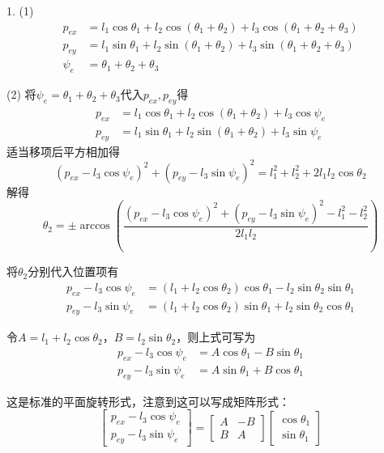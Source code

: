\documentclass[UTF8, 12pt]{ctexart}
\begin{document}
1.
(1)
\[
\begin{aligned}
p_{ex} &= l_1 \cos\theta_1 + l_2 \cos(\theta_1 + \theta_2) + l_3 \cos(\theta_1 + \theta_2 + \theta_3) \\
p_{ey} &= l_1 \sin\theta_1 + l_2 \sin(\theta_1 + \theta_2) + l_3 \sin(\theta_1 + \theta_2 + \theta_3) \\
\psi_e &= \theta_1 + \theta_2 + \theta_3
\end{aligned}
\]
\vspace{5em}


(2)
将\(\psi_e = \theta_1 + \theta_2 + \theta_3\)代入\(p_{ex},p_{ey}\)得
\[
\begin{aligned}
p_{ex} &= l_1 \cos\theta_1 + l_2 \cos(\theta_1 + \theta_2) + l_3 \cos\psi_e \\
p_{ey} &= l_1 \sin\theta_1 + l_2 \sin(\theta_1 + \theta_2) + l_3 \sin\psi_e
\end{aligned}
\]
适当移项后平方相加得
\[
(p_{ex} - l_3 \cos\psi_e)^2 + (p_{ey} - l_3 \sin\psi_e)^2 = l_1^2 + l_2^2 + 2l_1l_2\cos\theta_2
\]
解得
\[
\theta_2 = \pm \arccos\left(\frac{(p_{ex} - l_3 \cos\psi_e)^2 + (p_{ey} - l_3 \sin\psi_e)^2 - l_1^2 - l_2^2}{2l_1l_2}\right)
\]
\vspace{0.5em}

将\(\theta_2\)分别代入位置项有
\[
\begin{aligned}
p_{ex} - l_3 \cos\psi_e &= (l_1 + l_2 \cos\theta_2) \cos\theta_1 - l_2 \sin\theta_2 \sin\theta_1 \\
p_{ey} - l_3 \sin\psi_e &= (l_1 + l_2 \cos\theta_2) \sin\theta_1 + l_2 \sin\theta_2 \cos\theta_1
\end{aligned}
\]

令\(A = l_1 + l_2 \cos\theta_2\)，\(B = l_2 \sin\theta_2\)，则上式可写为
\[
\begin{aligned}
p_{ex} - l_3 \cos\psi_e &= A \cos\theta_1 - B \sin\theta_1 \\
p_{ey} - l_3 \sin\psi_e &= A \sin\theta_1 + B \cos\theta_1
\end{aligned}
\]

这是标准的平面旋转形式，注意到这可以写成矩阵形式：
\[
\begin{bmatrix} p_{ex} - l_3 \cos\psi_e \\ p_{ey} - l_3 \sin\psi_e \end{bmatrix} = \begin{bmatrix} A & -B \\ B & A \end{bmatrix} \begin{bmatrix} \cos\theta_1 \\ \sin\theta_1 \end{bmatrix}
\]
\end{document}
